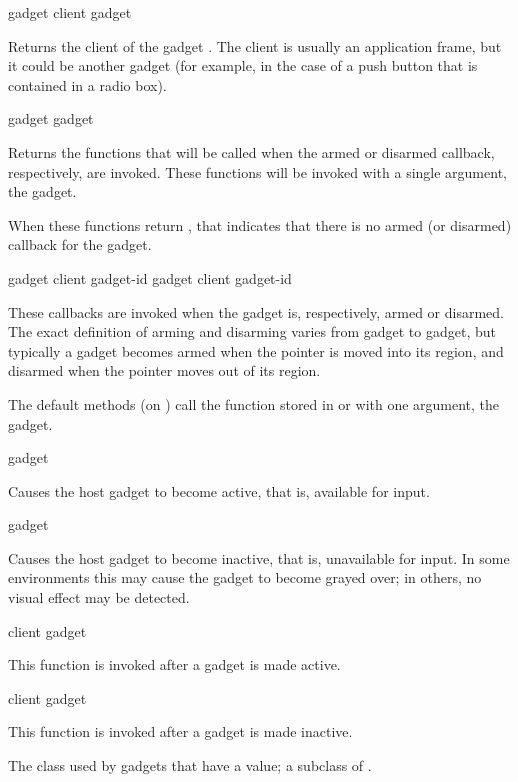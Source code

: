  {gadget}
 {client gadget}

Returns the client of the gadget .  The client is usually an
application frame, but it could be another gadget (for example, in the case of a
push button that is contained in a radio box).

 {gadget}
 {gadget}

Returns the functions that will be called when the armed or disarmed callback,
respectively, are invoked.  These functions will be invoked with a single
argument, the gadget.

When these functions return , that indicates that there is no armed (or
disarmed) callback for the gadget.

 {gadget client gadget-id}
 {gadget client gadget-id}

These callbacks are invoked when the gadget  is, respectively, armed
or disarmed.  The exact definition of arming and disarming varies from gadget to
gadget, but typically a gadget becomes armed when the pointer is moved into its
region, and disarmed when the pointer moves out of its region.

The default methods (on ) call the function stored in
 or  with one argument,
the gadget.

 {gadget}

Causes the host gadget to become active, that is, available for input.

 {gadget}

Causes the host gadget to become inactive, that is, unavailable for input.  In
some environments this may cause the gadget to become grayed over; in others, no
visual effect may be detected.

 {client gadget}

This function is invoked after a gadget is made active.

 {client gadget}

This function is invoked after a gadget is made inactive.



The class used by gadgets that have a value; a subclass of .

